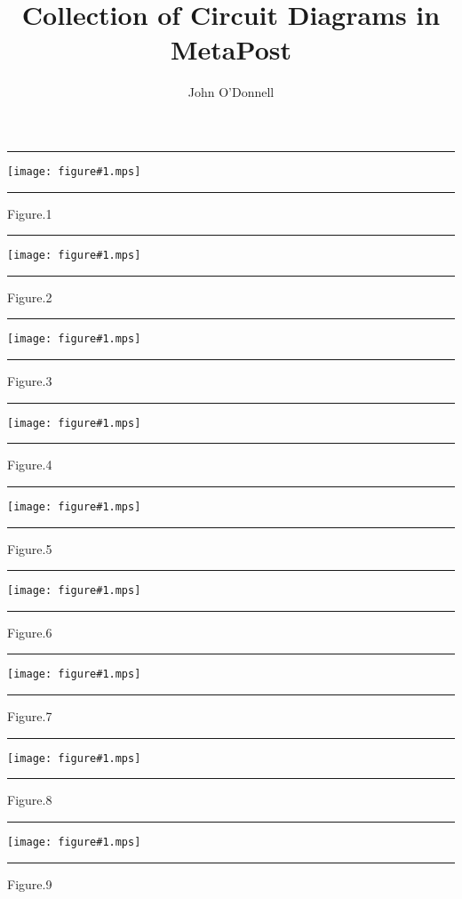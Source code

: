 \documentclass{book}
\title{Collection of Circuit Diagrams in MetaPost}
\author{John O'Donnell}
\begin{document}
\maketitle

\newcommand{\showfig}[1]{%
  \hrule
  \begin{center}
  \texttt{[image: figure\#1.mps]}
  \end{center}
  \hrule
  {Figure.#1}}

\showfig{1}
\showfig{2}
\showfig{3}
\showfig{4}
\showfig{5}
\showfig{6}
\showfig{7}
\showfig{8}
\showfig{9}
\end{document}
